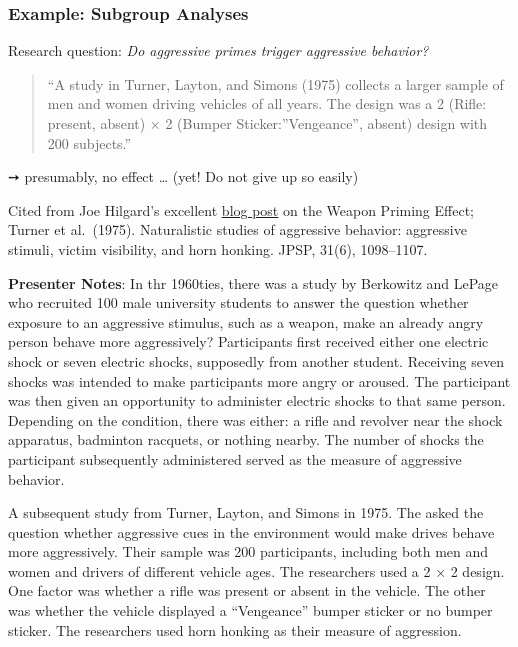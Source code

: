 \documentclass[
  english,
  letterpaper,
  DIV=11,
  numbers=noendperiod]{scrartcl}
\begin{document}
\subsubsection{Example: Subgroup
Analyses}\label{example-subgroup-analyses}

Research question: \emph{Do aggressive primes trigger aggressive
behavior?}

\begin{quote}
``A study in Turner, Layton, and Simons (1975) collects a larger sample
of men and women driving vehicles of all years. The design was a 2
(Rifle: present, absent) × 2 (Bumper Sticker:''Vengeance'', absent)
design with 200 subjects.''
\end{quote}

➙ presumably, no effect \ldots{} (yet! Do not give up so easily)

Cited from Joe Hilgard's excellent
\href{http://crystalprisonzone.blogspot.com/2016/03/the-weapons-priming-effect.html}{blog
post} on the Weapon Priming Effect; Turner et al.~(1975). Naturalistic
studies of aggressive behavior: aggressive stimuli, victim visibility,
and horn honking. JPSP, 31(6), 1098--1107.

\textbf{Presenter Notes}: In thr 1960ties, there was a study by
Berkowitz and LePage who recruited 100 male university students to
answer the question whether exposure to an aggressive stimulus, such as
a weapon, make an already angry person behave more aggressively?
Participants first received either one electric shock or seven electric
shocks, supposedly from another student. Receiving seven shocks was
intended to make participants more angry or aroused. The participant was
then given an opportunity to administer electric shocks to that same
person. Depending on the condition, there was either: a rifle and
revolver near the shock apparatus, badminton racquets, or nothing
nearby. The number of shocks the participant subsequently administered
served as the measure of aggressive behavior.

A subsequent study from Turner, Layton, and Simons in 1975. The asked
the question whether aggressive cues in the environment would make
drives behave more aggressively. Their sample was 200 participants,
including both men and women and drivers of different vehicle ages. The
researchers used a 2 × 2 design. One factor was whether a rifle was
present or absent in the vehicle. The other was whether the vehicle
displayed a ``Vengeance'' bumper sticker or no bumper sticker. The
researchers used horn honking as their measure of aggression.
\end{document}

